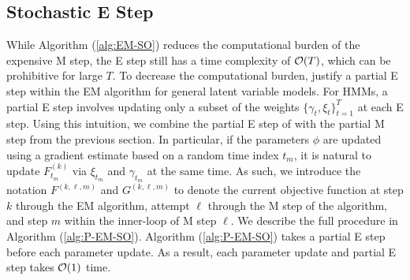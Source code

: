 



\subsection{Stochastic E Step}
\label{subsec:stoch_E}

While Algorithm (\ref{alg:EM-SO}) reduces the computational burden of the expensive M step, the E step still has a time complexity of $\mathcal{O}(T)$, which can be prohibitive for large $T$. To decrease the computational burden, \citet{Neal:1998} justify a partial E step within the EM algorithm for general latent variable models. %
For HMMs, a partial E step involves updating only a subset of the weights $\{\gamma_t,\xi_t\}_{t=1}^T$ 
at each E step. Using this intuition, we combine the partial E step of \citet{Neal:1998} with the partial M step from the previous section. In particular, if the parameters $\phi$ are updated using a gradient estimate based on a random time index $t_{m}$, it is natural to update $F_{t_{m}}^{(k)}$ via $\xi_{t_{m}}$ and $\gamma_{t_{m}}$ at the same time. As such, we introduce the notation $F^{(k,\ell,m)}$ and $G^{(k,\ell,m)}$ to denote the current objective function at step $k$ through the EM algorithm, attempt $\ell$ through the M step of the algorithm, and step $m$ within the inner-loop of M step $\ell$. We describe the full procedure in Algorithm (\ref{alg:P-EM-SO}). Algorithm (\ref{alg:P-EM-SO}) takes a partial E step before each parameter update. As a result, each parameter update and partial E step takes $\mathcal{O}(1)$ time.

